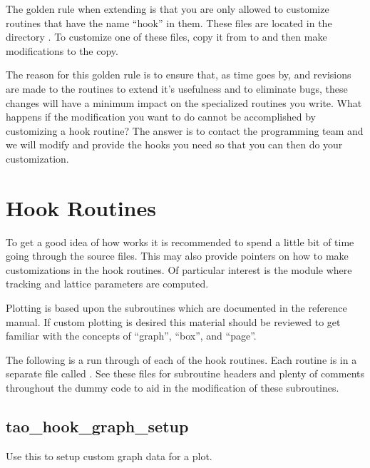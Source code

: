 The golden rule when extending \tao is that you are only allowed to
customize routines that have the name ``hook'' in
them. These files are located in the directory .
To customize one of these files, copy it from  to 
and then make modifications to the copy.

The reason for this golden rule is to ensure that, as time
goes by, and revisions are made to the \tao routines to extend it's
usefulness and to eliminate bugs, these changes will
have a minimum impact on the specialized routines you write.
What happens if the modification you want to do cannot be accomplished
by customizing a hook routine? The answer is to contact
the \tao programming team and we will modify \tao and provide the hooks 
you need so that you can then do your customization.

\section{Hook Routines}

To get a good idea of how \tao works it is recommended to spend a
little bit of time going through the source files. This may also
provide pointers on how to make customizations in the hook routines. Of
particular interest is the module  where tracking
and lattice parameters are computed. 

Plotting is based upon the  subroutines which are
documented in the \bmad reference manual. If custom plotting is
desired this material should be reviewed to get familiar with the
concepts of ``graph'', ``box'', and ``page''.

The following is a run through of each of the hook routines. Each
routine is in a separate file called
. See these files for subroutine
headers and plenty of comments throughout the dummy code to aid in the
modification of these subroutines.

\subsection{tao\_hook\_graph\_setup}

Use this to setup custom graph data for a plot.

